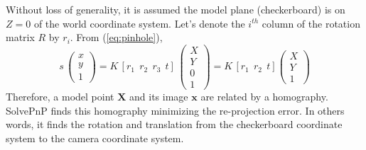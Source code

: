Without loss of generality, it is assumed the model plane (checkerboard) is on $Z=0$ of the world coordinate system. Let's denote the $i^{th}$ column of the rotation matrix $R$ by $r_i$. From (\ref{eq:pinhole}),
\begin{equation}
  s\,\begin{pmatrix}
      x \\
      y \\
      1
\end{pmatrix}
= K\, [r_1~~r_2~~r_3~~t]\,\begin{pmatrix}
      X \\
      Y \\
      0 \\
      1
\end{pmatrix}
= K\, [r_1~~r_2~~t]\begin{pmatrix}
      X \\
      Y \\
      1
\end{pmatrix}
\end{equation}
Therefore, a model point $\mathbf{X}$ and its image $\mathbf{x}$ are related by a homography. SolvePnP finds this homography minimizing the re-projection error. In others words, it finds the rotation and translation from the checkerboard coordinate system to the camera coordinate system.


%
%
%
%




